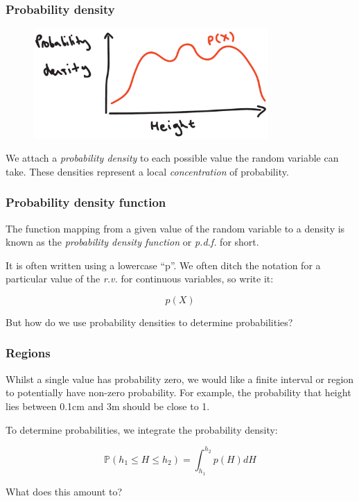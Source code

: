 \documentclass{beamer}
\begin{document}
	\begin{frame}
		\frametitle{Probability density}
		
		\begin{figure}[ht]
			\centerline{\includegraphics[width=0.8\textwidth]{./figures/height_density.pdf}}
		\end{figure}
		
		We attach a \textit{probability density} to each possible value the random variable can take. These densities represent a local \textit{concentration} of probability.
		
	\end{frame}
	
	\begin{frame}
		\frametitle{Probability density function}
		
		The function mapping from a given value of the random variable to a density is known as the \textit{probability density function} or \textit{p.d.f.} for short.
		
		\vspace{0.5cm}
		
		It is often written using a lowercase ``p''. We often ditch the notation for a particular value of the \textit{r.v.} for continuous variables, so write it:
		
		\begin{equation}
		p(X)
		\end{equation}
		
		But how do we use probability densities to determine probabilities?
		
	\end{frame}
	
	\begin{frame}
		\frametitle{Regions}
		
		Whilst a single value has probability zero, we would like a finite interval or region to potentially have non-zero probability. For example, the probability that height lies between 0.1cm and 3m should be close to 1.
		
		\vspace{0.5cm}
		
		To determine probabilities, we integrate the probability density:
		
		\begin{equation}
		\mathbb{P}(h_1 \leq H \leq h_2) = \int_{h_1}^{h_2} p(H) dH
		\end{equation}
		
		What does this amount to?
		
	\end{frame}
	
\end{document}

